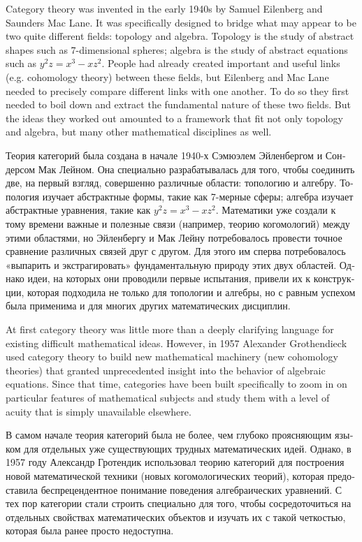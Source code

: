 \documentclass[a4paper]{book}
\theoremstyle{myth}
\begin{document}
\begin{russian}
Category theory was invented in the early 1940s by Samuel Eilenberg and Saunders Mac Lane. It was specifically designed to bridge what may appear to be two quite different fields: topology and algebra. Topology is the study of abstract shapes such as 7-dimensional spheres; algebra is the study of abstract equations such as $y^2z=x^3-xz^2$. People had already created important and useful links (e.g. cohomology theory) between these fields, but Eilenberg and Mac Lane needed to precisely compare different links with one another. To do so they first needed to boil down and extract the fundamental nature of these two fields. But the ideas they worked out amounted to a framework that fit not only topology and algebra, but many other mathematical disciplines as well.

Теория категорий была создана в начале 1940-х Сэмюэлем Эйленбергом и Сондерсом Мак Лейном. Она специально разрабатывалась для того, чтобы соединить две, на первый взгляд, совершенно различные области: топологию и алгебру. Топология изучает абстрактные формы, такие как 7-мерные сферы; алгебра изучает абстрактные уравнения, такие как $y^2z=x^3-xz^2$. Математики уже создали к тому времени важные и полезные связи (например, теорию когомологий) между этими областями, но Эйленбергу и Мак Лейну потребовалось провести точное сравнение различных связей друг с другом. Для этого им сперва потребовалось «выпарить и экстрагировать» фундаментальную природу этих двух областей. Однако идеи, на которых они проводили первые испытания, привели их к конструкции, которая подходила не только для топологии и алгебры, но с равным успехом была применима и для многих других математических дисциплин. 

At first category theory was little more than a deeply clarifying language for existing difficult mathematical ideas. However, in 1957 Alexander Grothendieck used category theory to build new mathematical machinery (new cohomology theories) that granted unprecedented insight into the behavior of algebraic equations. Since that time, categories have been built specifically to zoom in on particular features of mathematical subjects and study them with a level of acuity that is simply unavailable elsewhere.

В самом начале теория категорий была не более, чем глубоко проясняющим языком для отдельных уже существующих трудных математических идей. Однако, в 1957 году Александр Гротендик использовал теорию категорий для построения новой математической техники (новых когомологических теорий), которая предоставила беспрецендентное понимание поведения алгебраических уравнений. С тех пор категории стали строить специально для того, чтобы сосредоточиться на отдельных свойствах математических объектов и изучать их с такой четкостью, которая была ранее просто недоступна. 


\end{russian}
\end{document}
